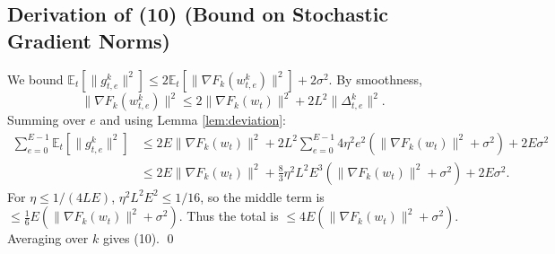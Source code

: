 \documentclass{article}
\begin{document}
\subsection*{Derivation of (10) (Bound on Stochastic Gradient Norms)}
We bound $\mathbb{E}_t[\|g_{t,e}^k\|^2] \le 2\mathbb{E}_t[\|\nabla F_k(w_{t,e}^k)\|^2] + 2\sigma^2$. By smoothness,
\begin{equation}
\|\nabla F_k(w_{t,e}^k)\|^2 \le 2\|\nabla F_k(w_t)\|^2 + 2L^2 \|\Delta_{t,e}^k\|^2.
\end{equation}
Summing over $e$ and using Lemma \ref{lem:deviation}:
\begin{align}
\sum_{e=0}^{E-1} \mathbb{E}_t[\|g_{t,e}^k\|^2] &\le 2E \|\nabla F_k(w_t)\|^2 + 2L^2 \sum_{e=0}^{E-1} 4\eta^2 e^2 (\|\nabla F_k(w_t)\|^2 + \sigma^2) + 2E\sigma^2 \\
&\le 2E \|\nabla F_k(w_t)\|^2 + \frac{8}{3}\eta^2 L^2 E^3 (\|\nabla F_k(w_t)\|^2 + \sigma^2) + 2E\sigma^2.
\end{align}
For $\eta \le 1/(4LE)$, $\eta^2 L^2 E^2 \le 1/16$, so the middle term is $\le \frac{1}{6}E (\|\nabla F_k(w_t)\|^2 + \sigma^2)$. Thus the total is $\le 4E (\|\nabla F_k(w_t)\|^2 + \sigma^2)$. Averaging over $k$ gives (10). \qed
\end{document}

